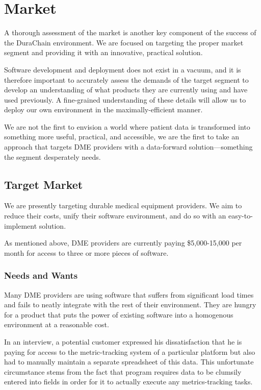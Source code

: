 \section{Market}
A thorough assessment of the market is another key component of the success of the DuraChain environment. We are focused on targeting the proper market segment and providing it with an innovative, practical solution.%

Software development and deployment does not exist in a vacuum, and it is therefore important to accurately assess the demands of the target segment to develop an understanding of what products they are currently using and have used previously. A fine-grained understanding of these details will allow us to deploy our own environment in the maximally-efficient manner.%

We are not the first to envision a world where patient data is transformed into something more useful, practical, and accessible, we are the first to take an approach that targets DME providers with a data-forward solution---something the segment desperately needs.%

\subsection{Target Market}
We are presently targeting durable medical equipment providers. We aim to reduce their costs, unify their software environment, and do so with an easy-to-implement solution.%

As mentioned above, DME providers are currently paying \$5,000-15,000 per month for access to three or more pieces of software.%

  \subsubsection{Needs and Wants}
  Many DME providers are using software that suffers from significant load times and fails to neatly integrate with the rest of their environment. They are hungry for a product that puts the power of existing software into a homogenous environment at a reasonable cost.%

  In an interview, a potential customer expressed his dissatisfaction that he is paying for access to the metric-tracking system of a particular platform but also had to manually maintain a separate spreadsheet of this data. This unfortunate circumstance stems from the fact that program requires data to be clumsily entered into fields in order for it to actually execute any metrics-tracking tasks.%

